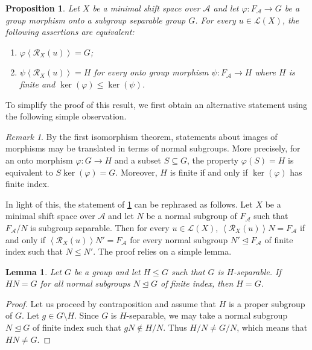 \documentclass{amsart}
\newcommand*{\ret}{\mathcal{R}}
\newcommand*{\lang}{\mathcal{L}}
\newcommand*{\cA}{\mathcal{A}}
\newcommand*{\from}{\colon}
\newcommand*{\gen}[1]{\left\langle #1\right\rangle}
\theoremstyle{plain}
\newtheorem{proposition}[theorem]{Proposition}
\newtheorem{lemma}[theorem]{Lemma}
\theoremstyle{definition}
\theoremstyle{remark}
\newtheorem{remark}[theorem]{Remark}
\begin{document}
\begin{proposition}\label{p:local-global}
    Let $X$ be a minimal shift space over $\cA$ and let $\varphi\from F_\cA\to G$ be a group morphism onto a subgroup separable group $G$. For every $u\in\lang(X)$, the following assertions are equivalent:
    \begin{enumerate}
        \item $\varphi\gen{\ret_X(u)} = G$;
        \item $\psi\gen{\ret_X(u)} = H$ for every onto group morphism $\psi\from F_\cA\to H$ where $H$ is finite and $\ker(\varphi)\leq\ker(\psi)$.
    \end{enumerate}
\end{proposition}

To simplify the proof of this result, we first obtain an alternative statement using the following simple observation. 

\begin{remark}\label{R:from morphisms to normal subgroups}
    By the first isomorphism theorem, statements about images of morphisms may be translated in terms of normal subgroups. More precisely, for an onto morphism $\varphi\from G \to H$ and a subset $S \subseteq G$, the property $\varphi(S) = H$ is equivalent to $S\ker(\varphi) = G$. Moreover, $H$ is finite if and only if $\ker(\varphi)$ has finite index.
\end{remark}

In light of this, the statement of \cref{p:local-global} can be rephrased as follows. Let $X$ be a minimal shift space over $\cA$ and let $N$ be a normal subgroup of $F_\cA$ such that $F_\cA/N$ is subgroup separable. Then for every $u \in \lang(X)$, $\gen{\ret_X(u)}N = F_\cA$ if and only if $\gen{\ret_X(u)}N' = F_\cA$ for every normal subgroup $N' \trianglelefteq F_\cA$ of finite index such that $N \leq N'$. The proof relies on a simple lemma.
\begin{lemma}\label{l:local-global}
    Let $G$ be a group and let $H\leq G$ such that $G$ is $H$-separable. If $HN=G$ for all normal subgroups $N\trianglelefteq G$ of finite index, then $H=G$.
\end{lemma}

\begin{proof}
    Let us proceed by contraposition and assume that $H$ is a proper subgroup of $G$. Let $g \in G \setminus H$. Since $G$ is $H$-separable, we may take a normal subgroup $N \trianglelefteq G$ of finite index such that $gN \not \in H/N$. Thus $H/N \neq G/N$, which means that $HN \neq G$.
\end{proof}
\end{document}
